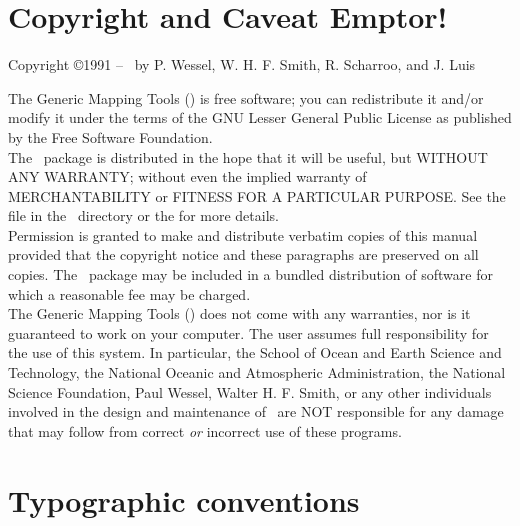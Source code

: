 
\chapter*{Copyright and Caveat Emptor!}

\begin{center}
Copyright \copyright 1991 -- \GMTDOCYEAR\ by P. Wessel, W. H. F. Smith, R. Scharroo, and J. Luis
\end{center}

\vspace{\baselineskip}

The Generic Mapping Tools (\GMT) is free software; you can redistribute
it and/or modify it under the terms of the GNU Lesser General Public License
as published by the Free Software Foundation. \\

The \GMT\ package is distributed in the hope that it will be useful, but
WITHOUT ANY WARRANTY; without even the implied warranty of
MERCHANTABILITY or FITNESS FOR A PARTICULAR PURPOSE.  See the
file  in the \GMT\ directory or the
for more details. \\

Permission is granted to make and distribute verbatim copies of this
manual provided that the copyright notice and these paragraphs are
preserved on all copies.  The \GMT\ package may be included in a bundled
distribution of software for which a reasonable fee may be charged. \\

The Generic Mapping Tools (\GMT) does not come with any warranties,
nor is it guaranteed to work on your computer.  The user assumes full
responsibility for the use of this system. In particular, the School of
Ocean and Earth Science and Technology, the National Oceanic and
Atmospheric Administration, the National Science Foundation,
Paul Wessel, Walter H. F. Smith, or any other individuals involved in
the design and maintenance of \GMT\ are NOT responsible for any damage
that may follow from correct \emph{or} incorrect use of these programs.


\chapter*{Typographic conventions}

